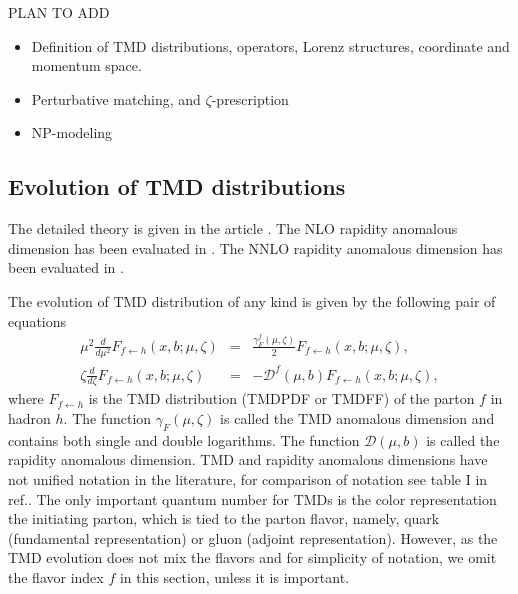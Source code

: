 \documentclass[prd,nofootinbib,eqsecnum,final]{revtex4}
\newcommand{\ot}{\leftarrow}
\renewcommand{\(}{\left(}
\renewcommand{\)}{\right)}
\renewcommand{\[}{\left[}
\renewcommand{\]}{\right]}
\newcommand{\red}[1]{{\color[rgb]{1,0,0} #1}}
\begin{document}
\red{PLAN TO ADD}
\begin{itemize}
\item Definition of TMD distributions, operators, Lorenz structures, coordinate and momentum space. 
\item Perturbative matching, and $\zeta$-prescription
\item NP-modeling
\end{itemize}


\subsection{Evolution of TMD distributions}

The detailed theory is given in the article \cite{Scimemi:2018xaf}. The NLO rapidity anomalous dimension has been evaluated in \cite{Echevarria:2015byo}. The NNLO rapidity anomalous dimension has been evaluated in \cite{Vladimirov:2016dll,Vladimirov:2017ksc}.

The evolution of TMD distribution of any kind is given by the following pair of equations
\begin{eqnarray}\label{def:TMD_ev_UV}
\mu^2 \frac{d}{d\mu^2} F_{f\ot h}(x,b;\mu,\zeta)&=&\frac{\gamma^f_F(\mu,\zeta)}{2}F_{f\ot h}(x,b;\mu,\zeta),
\\\label{def:TMD_ev_RAP}
\zeta\frac{d}{d\zeta}F_{f \ot h}(x,b;\mu,\zeta)&=& -\mathcal{D}^f(\mu,b)F_{f\ot h}(x,b;\mu,\zeta),
\end{eqnarray}
where $F_{f\ot h}$ is the TMD distribution (TMDPDF or TMDFF) of the parton $f$ in hadron $h$. The function $\gamma_F(\mu,\zeta)$ is called the TMD anomalous dimension and contains both single and double logarithms. The function $\mathcal{D}(\mu,b)$ is called the rapidity anomalous dimension. TMD and rapidity anomalous dimensions have not unified notation in the literature, for comparison of notation see table I in ref.\cite{Scimemi:2018xaf}. The only important quantum number for TMDs is the color representation the initiating parton, which is tied to the parton flavor, namely, quark (fundamental representation) or gluon (adjoint representation). However,  as the TMD evolution does not mix the flavors and  for simplicity of  notation, we omit the flavor index $f$ in this section, unless it is important. 
\end{document}
